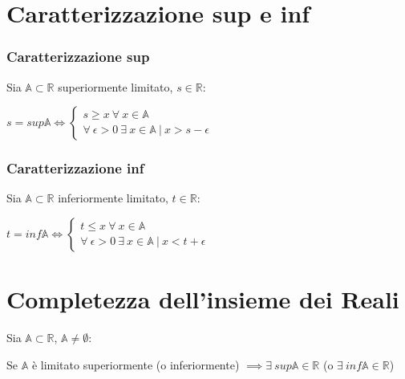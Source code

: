 \section{Caratterizzazione sup e inf}
\subsubsection{Caratterizzazione sup}
Sia $\mathbb{A} \subset \mathbb{R}$ superiormente limitato, $s \in \mathbb{R}$:\\
\begin{Large}
$s=sup\mathbb{A} \iff
\begin{cases}
s \geq x\ \forall\ x \in \mathbb{A}\\
\forall\ \epsilon > 0\ \exists\ x \in \mathbb{A}\ |\ x > s-\epsilon
\end{cases}$
\end{Large}
\subsubsection{Caratterizzazione inf}
Sia $\mathbb{A} \subset \mathbb{R}$ inferiormente limitato, $t \in \mathbb{R}$:\\
\begin{Large}
$t=inf\mathbb{A} \iff
\begin{cases}
t \leq x\ \forall\ x \in \mathbb{A}\\
\forall\ \epsilon > 0\ \exists\ x \in \mathbb{A}\ |\ x < t+\epsilon
\end{cases}$
\end{Large}

\section{Completezza dell'insieme dei Reali}
Sia $\mathbb{A} \subset \mathbb{R}$, $\mathbb{A} \neq \emptyset$:\\
\begin{Large}
Se $\mathbb{A}$ è limitato superiormente (o inferiormente) $\implies \exists\ sup\mathbb{A} \in \mathbb{R}$ (o $\exists\ inf\mathbb{A} \in \mathbb{R}$)
\end{Large}